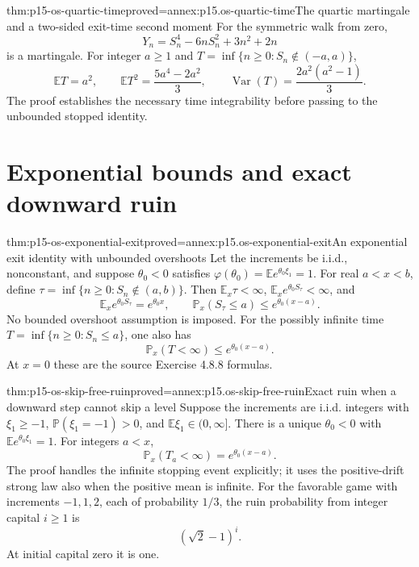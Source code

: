 \begin{hbtheorem}{thm:p15-os-quartic-time}{proved=annex:p15.os-quartic-time}{The quartic martingale and a two-sided exit-time second moment}
For the symmetric walk from zero,
\[
 Y_n=S_n^4-6nS_n^2+3n^2+2n
 \]
is a martingale. For integer \(a\geq1\) and
\(T=\inf\{n\geq0:S_n\notin(-a,a)\}\),
\[
 \mathbb ET=a^2,\qquad
 \mathbb ET^2=\frac{5a^4-2a^2}{3},\qquad
 \operatorname{Var}(T)=\frac{2a^2(a^2-1)}3.
 \]
The proof establishes the necessary time integrability before
passing to the unbounded stopped identity.
\end{hbtheorem}

\section{Exponential bounds and exact downward ruin}
\label{sec:p15-os-exponential-ruin}

\begin{hbtheorem}{thm:p15-os-exponential-exit}{proved=annex:p15.os-exponential-exit}{An exponential exit identity with unbounded overshoots}
Let the increments be i.i.d., nonconstant, and suppose
\(\theta_0<0\) satisfies
\(\varphi(\theta_0)=\mathbb Ee^{\theta_0\xi_1}=1\).
For real \(a<x<b\), define
\(\tau=\inf\{n\geq0:S_n\notin(a,b)\}\).
Then \(\mathbb E_x\tau<\infty\),
\(\mathbb E_x e^{\theta_0S_\tau}<\infty\), and
\[
 \mathbb E_x e^{\theta_0S_\tau}=e^{\theta_0x},\qquad
 \mathbb P_x(S_\tau\leq a)\leq e^{\theta_0(x-a)}.
 \]
No bounded overshoot assumption is imposed.
For the possibly infinite time
\(T=\inf\{n\geq0:S_n\leq a\}\), one also has
\[
 \mathbb P_x(T<\infty)\leq e^{\theta_0(x-a)}.
 \]
At \(x=0\) these are the source Exercise 4.8.8 formulas.
\end{hbtheorem}

\begin{hbtheorem}{thm:p15-os-skip-free-ruin}{proved=annex:p15.os-skip-free-ruin}{Exact ruin when a downward step cannot skip a level}
Suppose the increments are i.i.d. integers with
\(\xi_1\geq-1\), \(\mathbb P(\xi_1=-1)>0\), and
\(\mathbb E\xi_1\in(0,\infty]\).
There is a unique \(\theta_0<0\) with
\(\mathbb Ee^{\theta_0\xi_1}=1\).
For integers \(a<x\),
\[
 \mathbb P_x(T_a<\infty)=e^{\theta_0(x-a)}.
 \]
The proof handles the infinite stopping event explicitly;
it uses the positive-drift strong law also when the positive
mean is infinite.
For the favorable game with increments \(-1,1,2\), each of
probability \(1/3\), the ruin probability from integer
capital \(i\geq1\) is
\[
                    (\sqrt2-1)^i.
 \]
At initial capital zero it is one.
\end{hbtheorem}

